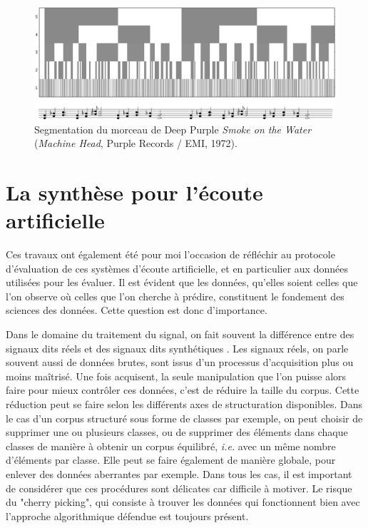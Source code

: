 \begin{figure}[t]
  \includegraphics[width=\textwidth]{figures/smokeCrop}
  \caption{Segmentation du morceau de Deep Purple \emph{Smoke on the Water} (\emph{Machine Head}, Purple Records / EMI, 1972).}  \label{fig:smoke}
\end{figure}

\section{ \nmu La  synthèse pour l'écoute artificielle} \label{sec:dcase}

Ces travaux ont également été pour moi l'occasion de réfléchir au protocole d'évaluation de ces systèmes d'écoute artificielle, et en particulier aux données utilisées pour les évaluer. Il est évident que les données, qu'elles soient celles que l'on observe où celles que l'on cherche à prédire, constituent le fondement des sciences des données. Cette question est donc d'importance.

Dans le domaine du traitement du signal, on fait souvent la différence entre des signaux dits \og réels \fg et des signaux dits \og synthétiques \fg. Les signaux réels, on parle souvent aussi de données brutes, sont issus d'un processus d'acquisition plus ou moins maîtrisé. Une fois acquisent, la seule manipulation que l'on puisse alors faire pour mieux contrôler ces données, c'est de réduire la taille du corpus. Cette réduction peut se faire selon les différents axes de structuration disponibles. Dans le cas d'un corpus structuré sous forme de classes par exemple, on peut choisir de supprimer une ou plusieurs classes, ou de supprimer des éléments dans chaque classes de manière à obtenir un corpus équilibré, \textit{i.e.} avec un même nombre d'éléments par classe. Elle peut se faire également de manière globale, pour enlever des données aberrantes par exemple. Dans tous les cas, il est important de considérer que ces procédures sont délicates car difficile à motiver. Le risque du "cherry picking", qui consiste à trouver les données qui fonctionnent bien avec l'approche algorithmique défendue est toujours présent.

